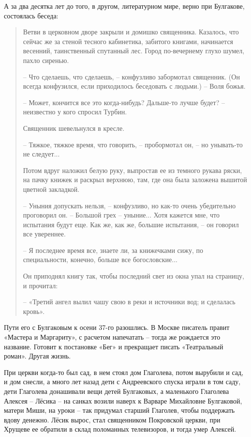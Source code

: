 А за два десятка лет до того, в другом, литературном мире, верно при Булгакове, состоялась беседа:

\begin{quotation}
Ветви в церковном дворе закрыли и домишко священника. Казалось, что сейчас же за стеной тесного кабинетика, забитого  книгами,  начинается  весенний, таинственный спутанный лес. Город по-вечернему глухо шумел, пахло сиренью.

   – Что сделаешь, что сделаешь, – конфузливо  забормотал священник.  (Он всегда конфузился, если приходилось беседовать с людьми.) – Воля божья.

   – Может, кончится  все  это  когда-нибудь?  Дальше-то  лучше  будет? – неизвестно у кого спросил Турбин.

Священник шевельнулся в кресле.

   – Тяжкое, тяжкое время, что говорить, – пробормотал он, – но унывать-то не следует...

Потом вдруг наложил белую руку, выпростав ее из темного рукава ряски, на пачку книжек и раскрыл верхнюю, там, где она была заложена  вышитой цветной закладкой.

   – Уныния допускать нельзя, – конфузливо, но как-то  очень  убедительно проговорил он. – Большой грех – уныние... Хотя кажется мне, что испытания будут еще. Как же, как же, большие испытания, – он говорил все увереннее.

   –  Я последнее время все, знаете ли, за книжечками сижу, по специальности, конечно, больше все богословские...

Он приподнял книгу так, чтобы последний свет из окна упал на  страницу, и прочитал:

   –  «Третий ангел вылил чашу свою в реки и  источники  вод;  и  сделалась кровь».
\end{quotation}

Пути его с Булгаковым к осени 37-го разошлись. В Москве писатель правит «Мастера и Маргариту», с расчетом напечатать – тогда же рождается это название. Готовит к постановке «Бег» и прекращает писать «Театральный роман». Другая жизнь.

При церкви когда-то был сад, в нем стоял дом Глаголева, потом вырубили и сад, и дом снесли, а много лет назад дети с Андреевского спуска играли в том саду, дети Глаголева донашивали вещи детей Булгаковых, а маленького Глаголева Алексея – Лёсика – на санках возили наверх к Варваре Михайловне Булгаковой, матери Миши, на уроки – так придумал старший Глаголев, чтобы поддержать вдову денежно. Лёсик вырос, стал священником Покровской церкви, при Хрущеве ее обратили в склад поломанных телевизоров, и тогда умер Алексей.

